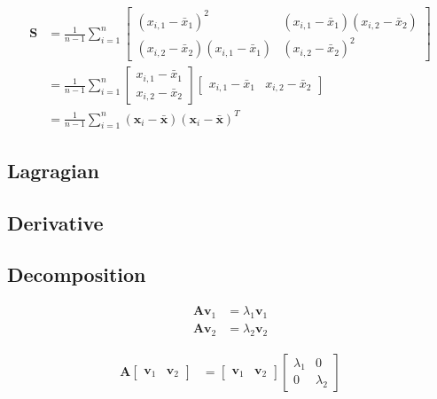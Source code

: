 \documentclass{article}
\begin{document}
\begin{align}
	\mathbf{S} & =\frac{1}{n-1}\sum_{i=1}^{n}\left[\begin{array}{cc}
		\left(x_{i,1}-\bar{x}_{1}\right)^{2} & \left(x_{i,1}-\bar{x}_{1}\right)\left(x_{i,2}-\bar{x}_{2}\right)\\
		\left(x_{i,2}-\bar{x}_{2}\right)\left(x_{i,1}-\bar{x}_{1}\right) & \left(x_{i,2}-\bar{x}_{2}\right)^{2}
	\end{array}\right]\\
	& =\frac{1}{n-1}\sum_{i=1}^{n}\left[\begin{array}{c}
		x_{i,1}-\bar{x}_{1}\\
		x_{i,2}-\bar{x}_{2}
	\end{array}\right]\left[\begin{array}{cc}
		x_{i,1}-\bar{x}_{1} & x_{i,2}-\bar{x}_{2}\end{array}\right]\\
	& =\frac{1}{n-1}\sum_{i=1}^{n}\left(\mathbf{x}_{i}-\bar{\mathbf{x}}\right)\left(\mathbf{x}_{i}-\bar{\mathbf{x}}\right)^{T}
\end{align}

\subsection{Lagragian}

\subsection{Derivative}

\subsection{Decomposition}

\begin{align}
	\mathbf{A}\mathbf{v}_{1} & =\lambda_{1}\mathbf{v}_{1}\\
	\mathbf{A}\mathbf{v}_{2} & =\lambda_{2}\mathbf{v}_{2}
\end{align}

\begin{align}
	\mathbf{A}\left[\begin{array}{cc}
		\mathbf{v}_{1} & \mathbf{v}_{2}\end{array}\right] & =\left[\begin{array}{cc}
		\mathbf{v}_{1} & \mathbf{v}_{2}\end{array}\right]\left[\begin{array}{cc}
		\lambda_{1} & 0\\
		0 & \lambda_{2}
	\end{array}\right]
\end{align}
\end{document}
